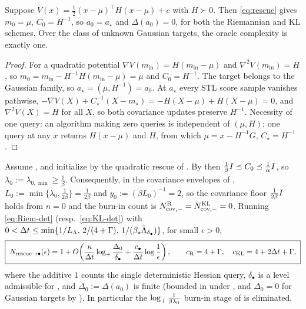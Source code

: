 \begin{theorem}
\label{thm:gauss-recovery}
Suppose $V(x)=\tfrac12(x-\mu)^\top H(x-\mu)+c$ with $H\succ0$. Then \eqref{eq:rescue} gives $m_0=\mu$,
$C_0=H^{-1}$, so $a_0=a_\star$ and $\Delta(a_0)=0$, for both the Riemannian and KL schemes. Over the
class of unknown Gaussian targets, the oracle complexity is exactly one.
\end{theorem}

\begin{proof}
For a quadratic potential $\nabla V(m_{\mathrm{in}})=H(m_{\mathrm{in}}-\mu)$ and $\nabla^2V(m_{\mathrm{in}})=H$,
so $m_0=m_{\mathrm{in}}-H^{-1}H(m_{\mathrm{in}}-\mu)=\mu$ and $C_0=H^{-1}$. The target belongs to the
Gaussian family, so $a_\star=(\mu,H^{-1})=a_0$. At $a_\star$ every STL score sample vanishes
pathwise, $-\nabla V(X)+C_\star^{-1}(X-m_\star)=-H(X-\mu)+H(X-\mu)=0$, and $\nabla^2V(X)=H$ for all
$X$, so both covariance updates preserve $H^{-1}$. Necessity of one query: an algorithm making zero
queries is independent of $(\mu,H)$; one query at any $x$ returns $H(x-\mu)$ and $H$, from which
$\mu=x-H^{-1}G$, $C_\star=H^{-1}$.
\end{proof}

\begin{theorem}
\label{thm:disc-rescue-to-FR}
Assume , and initialize by the quadratic rescue of
. By  then $\tfrac1\beta I\preceq C_0\preceq\tfrac1\alpha I$,
so $\lambda_0:=\lambda_{0,\min}\geq\tfrac1\beta$. Consequently, in the covariance envelopes of
, $L_0:=\min\{\lambda_0,\tfrac1{2\beta}\}=\tfrac1{2\beta}$ and
$y_0:=(\beta L_0)^{-1}=2$, so the covariance floor $\tfrac1{2\beta}I$ holds from $n=0$ and the
burn-in count is $N_{\mathrm{cov},-}^{\mathrm{R}}=N_{\mathrm{cov},-}^{\mathrm{KL}}=0$. Running \eqref{eq:Riem-det}
(resp.\ \eqref{eq:KL-det}) with
$0<\Delta t\leq\min\{1/L_\Lambda,\,2/(4+\Gamma),\,1/(\beta_\star\bar\Lambda_{\delta_\bullet})\}$, for small
$\epsilon>0$,
\[
    \boxed{\;
    N_{\mathrm{rescue}\to\bullet}(\epsilon)
    =1
    +O\!\left(\frac\kappa{\Delta t}\log_+\frac{\Delta_0}{\delta_\bullet}
    +\frac{c_\bullet}{\Delta t}\log\frac1\epsilon\right),
    \qquad
    c_{\mathrm{R}}=4+\Gamma,\quad c_{\mathrm{KL}}=4+2\Delta t+\Gamma,
    \;}
\]
where the additive $1$ counts the single deterministic Hessian query, $\delta_\bullet$ is a level
admissible for , and $\Delta_0:=\Delta(a_0)$ is finite (bounded in
 under , and $\Delta_0=0$ for Gaussian targets
by ). In particular the $\log_+\tfrac1{\beta\lambda_0}$ burn-in stage of
 is eliminated.
\end{theorem}

